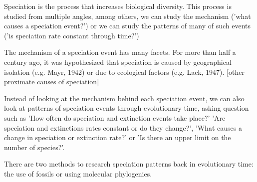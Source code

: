 Speciation is the process that increases biological diversity.
This process is studied from multiple angles, among others,
we can study the mechanism ('what
causes a speciation event?') or we can study the patterns of many
of such events ('is speciation rate constant through time?')

%
%

The mechanism of a speciation event has many facets.
For more than half a century ago, it was hypothesized
that speciation is caused by geographical isolation (e.g. Mayr, 1942)
or due to ecological factors (e.g. Lack, 1947). [other proximate 
causes of speciation]

%

Instead of looking at the mechanism behind each speciation event,
we can also look at patterns of speciation events through evolutionary time,
asking question such as 'How often do speciation and extinction events take place?'
'Are speciation and extinctions rates constant or do they change?',
'What causes a change in speciation or extinction rate?' or
'Is there an upper limit on the number of species?'.

There are two methods to research speciation patterns back in evolutionary time:
the use of fossils or using molecular phylogenies.


